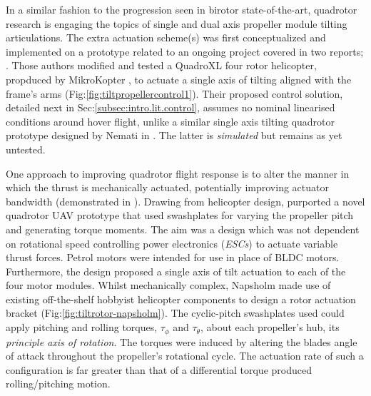 \par
In a similar fashion to the progression seen in birotor state-of-the-art, quadrotor research is engaging the topics of single and dual axis propeller module tilting articulations. The extra actuation scheme(s) was first conceptualized and implemented on a prototype related to an ongoing project covered in two reports; \cite{tiltpropellercontrol,tiltpropellerflight}. Those authors modified and tested a QuadroXL four rotor helicopter, propduced by MikroKopter \cite{mikrokopter}, to actuate a single axis of tilting aligned with the frame's arms (Fig:\ref{fig:tiltpropellercontrol1}). Their proposed control solution, detailed next in Sec:\ref{subsec:intro.lit.control}, assumes no nominal linearised conditions around hover flight, unlike a similar single axis tilting quadrotor prototype designed by Nemati in \cite{singleaxistilting}. The latter is \emph{simulated} but remains as yet untested.
\par
One approach to improving quadrotor flight response is to alter the manner in which the thrust is mechanically actuated, potentially improving actuator bandwidth (demonstrated in \cite{tiltgasco,tiltrihani}). Drawing from helicopter design, \cite{napsholm} purported a novel quadrotor UAV prototype that used swashplates for varying the propeller pitch and generating torque moments. The aim was a design which was not dependent on rotational speed controlling power electronics (\emph{ESCs}) to actuate variable thrust forces. Petrol motors were intended for use in place of BLDC motors. Furthermore, the design proposed a single axis of tilt actuation to each of the four motor modules. Whilst mechanically complex, Napsholm made use of existing off-the-shelf hobbyist helicopter components to design a rotor actuation bracket (Fig:\ref{fig:tiltrotor-napsholm}). The cyclic-pitch swashplates\cite{autonomousrobotspitch} used could apply pitching and rolling torques, $\tau_{\phi}$ and $\tau_{\theta}$, about each propeller's hub, its \emph{principle axis of rotation}. The torques were induced by altering the blades angle of attack throughout the propeller's rotational cycle. The actuation rate of such a configuration is far greater than that of a differential torque produced rolling/pitching motion.
